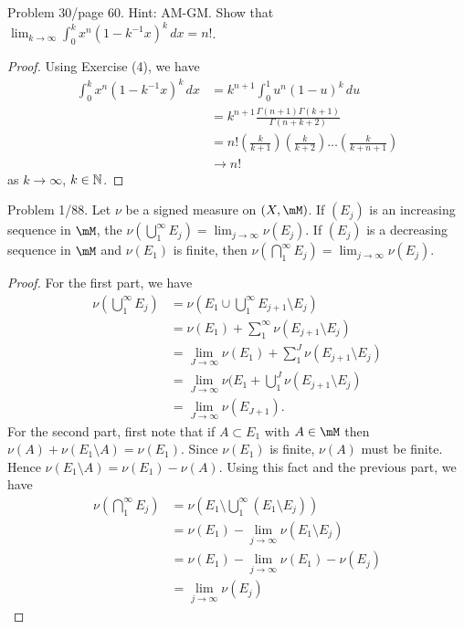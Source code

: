 \documentclass{article}
\begin{document}
 Problem 30/page 60. Hint: AM-GM. Show that $\lim_{k \to \infty} \int_0^k x^n (1 - k^{-1} x) ^k \, dx = n!$.
\begin{proof}
Using Exercise (4), we have
\begin{align*}
\int_0^k x^n (1 - k^{-1} x) ^k \, dx & =  k^{n+1} \int_0^1 u^n (1 - u)^k   \, du
\\ & =  k^{n+1} \frac{\Gamma(n+1) \Gamma(k+1)}{\Gamma(n + k + 2)}
\\ & =  n! \left( \frac k {k +1} \right) \left( \frac k {k +2} \right) \ldots \left( \frac k {k +n +1} \right)
\\ & \to n!
\end{align*}
as $k \to \infty$, $k \in \mathbb{N}$.
\end{proof}

 Problem 1/88. Let $\nu$ be a signed measure on $(X, \mM)$. If $(E_j)$ is an increasing sequence in $\mM$, the $\nu(\bigcup_1^\infty E_j) = \lim_{j \to \infty} \nu(E_j)$. If $(E_j)$ is a decreasing sequence in $\mM$ and $\nu(E_1)$ is finite, then $\nu(\bigcap_1^\infty E_j) = \lim_{j \to \infty} \nu(E_j)$.
\begin{proof}
For the first part, we have
\begin{align*}
\nu(\bigcup_1^\infty E_j) & = \nu(E_1 \cup \bigcup_1^\infty E_{j+1} \setminus E_j)  
\\ & = \nu(E_1) + \sum_1^\infty \nu(E_{j+1} \setminus E_j)
\\ & = \lim_{J \to \infty} \nu(E_1) + \sum_1^J \nu(E_{j+1} \setminus E_j)
\\ & = \lim_{J \to \infty} \nu(E_1 + \bigcup_1^J \nu(E_{j+1} \setminus E_j)
\\ & = \lim_{J \to \infty} \nu(E_{J+1}).
\end{align*}
For the second part, first note that if $A \subset E_1$ with $A \in \mM$ then $\nu(A) + \nu(E_1 \setminus A) = \nu(E_1)$. Since $\nu(E_1)$ is finite, $\nu(A)$ must be finite. Hence $\nu(E_1 \setminus A) = \nu(E_1) - \nu(A)$.  Using this fact and the previous part, we have
\begin{align*}
\nu(\bigcap_1^\infty E_j) & = \nu(E_1 \setminus \bigcup_1^\infty (E_1 \setminus E_j))
\\ & = \nu(E_1) - \lim_{j \to \infty} \nu(E_1 \setminus E_j)
\\ & = \nu(E_1) - \lim_{j \to \infty} \nu(E_1) - \nu(E_j)
\\ & = \lim_{j \to \infty} \nu(E_j)
\end{align*}
\end{proof}
\end{document}

